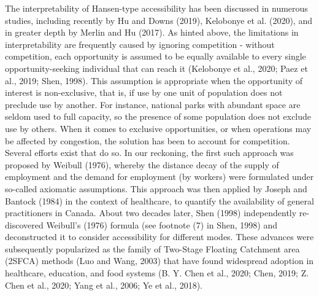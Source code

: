 \documentclass[]{elsarticle} %
\begin{document}
The interpretability of Hansen-type accessibility has been discussed in
numerous studies, including recently by Hu and Downs (2019), Kelobonye
et al. (2020), and in greater depth by Merlin and Hu (2017). As hinted
above, the limitations in interpretability are frequently caused by
ignoring competition - without competition, each opportunity is assumed
to be equally available to every single opportunity-seeking individual
that can reach it (Kelobonye et al., 2020; Paez et al., 2019; Shen,
1998). This assumption is appropriate when the opportunity of interest
is non-exclusive, that is, if use by one unit of population does not
preclude use by another. For instance, national parks with abundant
space are seldom used to full capacity, so the presence of some
population does not exclude use by others. When it comes to exclusive
opportunities, or when operations may be affected by congestion, the
solution has been to account for competition. Several efforts exist that
do so. In our reckoning, the first such approach was proposed by Weibull
(1976), whereby the distance decay of the supply of employment and the
demand for employment (by workers) were formulated under so-called
axiomatic assumptions. This approach was then applied by Joseph and
Bantock (1984) in the context of healthcare, to quantify the
availability of general practitioners in Canada. About two decades
later, Shen (1998) independently re-discovered Weibull's (1976) formula
(see footnote (7) in Shen, 1998) and deconstructed it to consider
accessibility for different modes. These advances were subsequently
popularized as the family of Two-Stage Floating Catchment area (2SFCA)
methods (Luo and Wang, 2003) that have found widespread adoption in
healthcare, education, and food systems (B. Y. Chen et al., 2020; Chen,
2019; Z. Chen et al., 2020; Yang et al., 2006; Ye et al., 2018).
\end{document}
